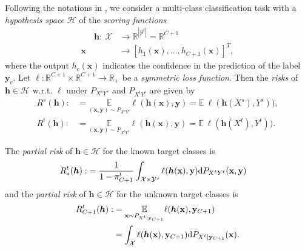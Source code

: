 \documentclass[journal]{IEEEtran}
\begin{document}
Following the notations in \cite{DBLP:conf/icml/0002LLJ19}, we consider a
multi-class classification task with a {\textit{hypothesis space}} $\mathcal{H}$ of the {\textit{scoring functions}}
\begin{equation}\label{hyp}
\begin{split}
    ~~~~~~~{\bm {h}}:~\mathcal{X}&\rightarrow \mathbb{R}^{|\mathcal{Y}^t|}=\mathbb{R}^{C+1}\\
    {\mathbf{x}}&\rightarrow [h_1({\mathbf{x}}),...,h_{C+1}({\mathbf{x}})]^T,
    \end{split}
\end{equation}
where the output $h_c({\mathbf{x}})$ indicates the confidence in the prediction of the label $\mathbf{ y}_c$. Let $\ell: \mathbb{R}^{C+1} \times \mathbb{R}^{C+1} \rightarrow \mathbb{R}_{+}$ be a {\textit{symmetric loss function}}.
Then the {\textit{risks}} of ${\bm h}\in \mathcal{H}$ w.r.t. $\ell$ under ${P}_{X^sY^s}$ and $P_{X^tY^t}$  are given by 
\begin{equation}\label{kk}
   \begin{split}
      R^s({\bm h}):&=\underset{{({\mathbf{x}},{\mathbf{y}})\sim{P}_{X^sY^s}}}{\mathbb{E}}\ell({\bm h}({\mathbf{x}}),{\mathbf{y}})=\mathbb{E}~\ell({\bm h}(X^s),Y^s)),\\R^t({\bm h}):&=\underset{{({\mathbf{x}},{\mathbf{y}})\sim{P}_{X^tY^t}}}{\mathbb{E}}\ell({\bm h}({\mathbf{x}}),{\mathbf{y}})=\mathbb{E}~\ell({\bm h}(X^t),Y^t)).
  \end{split}
\end{equation}


The {\textit{partial risk}} of ${\bm h}\in \mathcal{H}$ for the known target classes is
\begin{equation}\label{k1}
\begin{split}
R_*^t({\bm h}):&=\frac{1}{1-\pi^t_{C+1}}\int_{\mathcal{X}\times \mathcal{Y}^s}\ell({\bm h}({\mathbf{x}}),{\mathbf{y}}){\rm d}P_{X^tY^t}({\mathbf{x}},{\mathbf{y}})
\end{split}
\end{equation}
and the {\textit{partial risk}} of  ${\bm h}\in \mathcal{H}$ for the unknown target classes is
\begin{equation}\label{-k}
\begin{split}
   {R}_{C+1}^t({\bm h}):&=\underset{{{\mathbf{x}}\sim P_{X^t|{\mathbf{y}}_{C+1}}}}{\mathbb{E}} \ell({\bm h}({\mathbf{x}}),{\mathbf{y}}_{C+1})\\&=\int_{\mathcal{X}}\ell({\bm h}({\mathbf{x}}),{\mathbf{y}}_{C+1}){\rm d}P_{X^t|{\mathbf{y}}_{C+1}}(\mathbf{x}).
    \end{split}
\end{equation}
\end{document}
